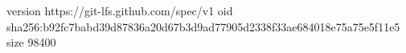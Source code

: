 version https://git-lfs.github.com/spec/v1
oid sha256:b92fc7babd39d87836a20d67b3d9ad77905d2338f33ae684018e75a75e5f11e5
size 98400
